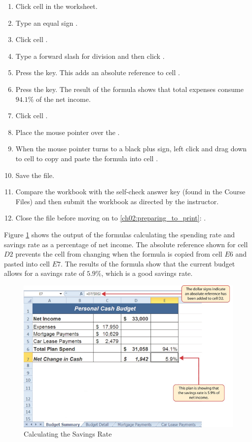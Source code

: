\begin{enumerate}
	\item Click cell  in the  worksheet.
	\item Type an equal sign \fmtTyping{=}.
	\item Click cell .
	\item Type a forward slash \fmtTyping{/} for division and then click .
	\item Press the  key. This adds an absolute reference to cell .
	\item Press the  key. The result of the formula shows that total expenses consume $ 94.1\% $ of the net income.
	\item Click cell .
	\item Place the mouse pointer over the .
	\item When the mouse pointer turns to a black plus sign, left click and drag down to cell  to copy and paste the formula into cell .
	\item Save the  file.
	\item Compare the workbook with the self-check answer key (found in the Course Files) and then submit the  workbook as directed by the instructor.
	\item Close the  file before moving on to \ref{ch02:preparing_to_print}: .
\end{enumerate}

Figure \ref{02:fig39} shows the output of the formulas calculating the spending rate and savings rate as a percentage of net income. The absolute reference shown for cell $ D2 $ prevents the cell from changing when the formula is copied from cell $ E6 $ and pasted into cell $ E7 $. The results of the formula show that the current budget allows for a savings rate of $ 5.9\% $, which is a good savings rate.

\begin{figure}[H]
	\centering
	\includegraphics[width=\maxwidth{.95\linewidth}]{gfx/ch02_fig39}
	\caption{Calculating the Savings Rate}
	\label{02:fig39}
\end{figure}

